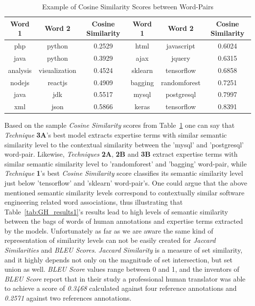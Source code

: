          \begin{table}
              \centering
              \caption{Example of Cosine Similarity Scores between Word-Pairs} \label{tab:cos_sim}
                \vspace{6pt} %
              \begin{tabular}{|c c c|c c c|}
                \hline
                Word 1 & Word 2 & Cosine Similarity & Word 1 & Word 2 & Cosine Similarity \\
                \hline
                php & python & 0.2529  & html & javascript & 0.6024 \\
                java & python & 0.3929 & ajax & jquery & 0.6315 \\
                analysis & visualization & 0.4524 & sklearn & tensorflow & 0.6858 \\ 
                nodejs & reactjs & 0.4909 &  bagging & randomforest & 0.7251 \\
                java & jdk& 0.5517 & mysql & postgresql & 0.7997 \\
                xml & json & 0.5866 & keras & tensorflow & 0.8391 \\
                \hline
              \end{tabular}
        \end{table}
            
        Based on the sample \emph{Cosine Similarity} scores from Table~\ref{tab:cos_sim} one can say that \emph{Technique} \textbf{3A}'s best model extracts expertise terms with similar semantic similarity level to the contextual similarity between the 'mysql' and 'postgresql' word-pair. Likewise, \emph{Techniques} \textbf{2A}, \textbf{2B} and \textbf{3B} extract expertise terms with similar semantic similarity level to 'randomforest' and 'bagging' word-pair, while \emph{Technique} \textbf{1}'s best \emph{Cosine Similarity} score classifies its semantic similarity level just below 'tensorflow' and 'sklearn' word-pair's. One could argue that the above mentioned semantic similarity levels correspond to contextually similar software engineering related word associations, thus illustrating that Table~\ref{tab:GH_results1}'s results lead to high levels of semantic similarity between the bags of words of human annotations and expertise terms extracted by the models. Unfortunately as far as we are aware the same kind of representation of similarity levels can not be easily created for \emph{Jaccard Similarities} and \emph{BLEU Scores}. \emph{Jaccard Similarity} is a measure of set similarity, and it highly depends not only on the magnitude of set intersection, but set union as well. \emph{BLEU Score} values range between 0 and 1, and the inventors of \emph{BLEU Score} report that in their study a professional human translator was able to achieve a score of \emph{0.3468} calculated against four reference annotations and \emph{0.2571} against two references annotations\cite{papineni2002bleu}.
        
